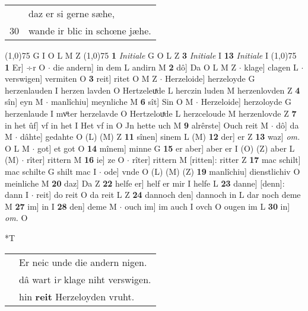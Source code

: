 \documentclass[8pt,a4paper,notitlepage]{article}
\begin{document}
\begin{table}[ht]
\begin{minipage}[t]{0.5\linewidth}
\begin{tabular}{rl}
 & daz er si gerne sæhe,\\ 
30 & wande ir blic in schœne jæhe.\\ 
\end{tabular}
\scriptsize
\line(1,0){75} \newline
G I O L M Z \newline
\line(1,0){75} \newline
\textbf{1} \textit{Initiale} G O L Z  \textbf{3} \textit{Initiale} I  \textbf{13} \textit{Initiale} I  \newline
\line(1,0){75} \newline
\textbf{1} Er] ÷r O  $\cdot$ die andern] in dem L andirn M \textbf{2} dô] Da O L M Z  $\cdot$ klage] clagen L  $\cdot$ verswigen] vermiten O \textbf{3} reit] ritet O M Z  $\cdot$ Herzeloide] herzeloyde G herzenlauden I herzen lavden O Hertzeleuͯde L herczin luden M herzenlovden Z \textbf{4} sîn] eyn M  $\cdot$ manlîchiu] meynliche M \textbf{6} sît] Sin O M  $\cdot$ Herzeloide] herzoloyde G herzenlaude I mvͦter herzelavde O Hertzelouͯde L herzceloude M herzenlovde Z \textbf{7} in het ûf] vf in het I Het vf in O Jn hette uch M \textbf{9} alrêrste] Ouch reit M  $\cdot$ dô] da M  $\cdot$ dâhte] gedahte O (L) (M) Z \textbf{11} sînen] sinem L (M) \textbf{12} der] er Z \textbf{13} waz] \textit{om.} O L M  $\cdot$ got] et got O \textbf{14} mînem] minne G \textbf{15} er aber] aber er I (O) (Z) aber L (M)  $\cdot$ rîter] rittern M \textbf{16} ie] ze O  $\cdot$ rîter] rittern M [ritten]: ritter Z \textbf{17} mac schilt] mac schilte G shilt mac I  $\cdot$ ode] vnde O (L) (M) (Z) \textbf{19} manlîchiu] dienstlichiv O meinliche M \textbf{20} daz] Da Z \textbf{22} helfe er] helf er mir I helfe L \textbf{23} danne] [denn]: dann I  $\cdot$ reit] do reit O da reit L Z \textbf{24} dannoch den] dannoch in L dar noch deme M \textbf{27} im] in I \textbf{28} den] deme M  $\cdot$ ouch im] im auch I ovch O ougen im L \textbf{30} in] \textit{om.} O \newline
\end{minipage}
\hspace{0.5cm}
\begin{minipage}[t]{0.5\linewidth}
\small
\begin{center}*T
\end{center}
\begin{tabular}{rl}
 & Er neic unde die andern nigen.\\ 
 & dâ wart i\textit{r} klage niht verswigen.\\ 
 & hin \textbf{reit} Herzeloyden vruht.\\ 

\end{tabular}
\end{minipage}
\end{table}
\end{document}

